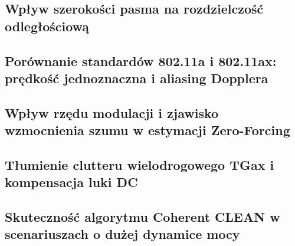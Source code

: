 \subsection{Wpływ szerokości pasma na rozdzielczość odległościową}
\label{subsec:sim_bandwidth_resolution}

\subsection{Porównanie standardów 802.11a i 802.11ax: prędkość jednoznaczna i aliasing Dopplera}
\label{subsec:sim_standards_comparison}

\subsection{Wpływ rzędu modulacji i zjawisko wzmocnienia szumu w estymacji Zero-Forcing}
\label{subsec:sim_modulation_noise}

\subsection{Tłumienie clutteru wielodrogowego TGax i kompensacja luki DC}
\label{subsec:sim_tgax_channel_effects}

\subsection{Skuteczność algorytmu Coherent CLEAN w scenariuszach o dużej dynamice mocy}
\label{subsec:sim_clean_performance}
